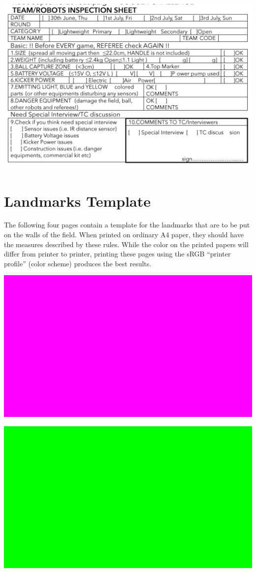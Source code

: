 \documentclass{article}
\begin{document}
\includegraphics[width=1\textwidth]{media/image10.png}

\section{Landmarks Template\label{ref-066}}

The following four pages contain a template for the landmarks that are to be put on the walls of the field. When printed on ordinary A4 paper, they should have the measures described by these rules. While the color on the printed papers will differ from printer to printer, printing these pages using the sRGB ``printer profile'' (color scheme) produces the best results.

\includegraphics[width=1\textwidth]{media/image11.png}

\includegraphics[width=1\textwidth]{media/image12.png}
\end{document}
